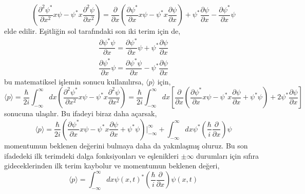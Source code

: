 \documentclass[a4paper,12pt, twoside]{article}
\begin{document}
\begin{equation*}
\left( \dfrac {\partial ^{2}\psi ^{\ast }}{\partial x^{2}}x\psi -\psi ^{\ast }x\dfrac {\partial ^{2}\psi }{\partial x^{2}}\right) = \dfrac {\partial }{\partial x}\left( \dfrac {\partial \psi ^{\ast }}{\partial x}x\psi -\psi ^{\ast }x\dfrac {\partial \psi }{\partial x}\right) +\psi ^{\ast }\dfrac {\partial \psi }{\partial x}-\dfrac {\partial \psi ^{\ast }}{\partial x}\psi 
\end{equation*}
elde edilir. Eşitliğin sol tarafındaki son iki terim için de,
\begin{align*}
\dfrac {\partial \psi ^{\ast }\psi }{\partial x}=\dfrac {\partial \psi ^{\ast }}{\partial x}\psi +\psi ^{\ast }\dfrac {\partial \psi }{\partial x}\\
\dfrac {\partial \psi ^{\ast }}{\partial x}\psi =\dfrac {\partial \psi ^{\ast }\psi }{\partial x}-\psi ^{\ast }\dfrac {\partial \psi }{\partial x}
\end{align*}
bu matematiksel işlemin sonucu kullanılırsa, $\langle p \rangle$ için,
\begin{equation*}
\langle p\rangle =\dfrac {\hbar }{2i}\int ^{\infty }_{-\infty }dx\left( \dfrac {\partial ^{2}\psi ^{\ast }}{\partial x^{2}}x\psi -\psi ^{\ast }x\dfrac {\partial ^{2}\psi }{\partial x^{2}}\right) =  \dfrac {\hbar }{2i}\int ^{\infty }_{-\infty }dx \left[\dfrac {\partial }{\partial x}\left( \dfrac {\partial \psi ^{\ast }}{\partial x}x\psi -\psi ^{\ast }x\dfrac {\partial \psi }{\partial x} + \psi^\ast \psi\right) +2\psi ^{\ast }\dfrac {\partial \psi }{\partial x}\right]
\end{equation*}
sonucuna ulaşılır. Bu ifadeyi biraz daha açarsak,
\begin{equation*}
\langle p\rangle = \dfrac {\hbar }{2i}\left( \dfrac {\partial \psi ^{\ast }}{\partial x}x\psi -\psi ^{\ast }x\dfrac {\partial \psi }{\partial x} + \psi^\ast \psi \right){\bigg |}_{-\infty}^{\infty} + \int ^{\infty }_{-\infty }dx \psi ^{\ast }\left(\dfrac {\hbar }{i}\dfrac {\partial}{\partial x}\right) \psi
\end{equation*}
momentumun beklenen değerini bulmaya daha da yakınlaşmış oluruz. Bu son ifadedeki ilk terimdeki dalga fonksiyonları ve eşlenikleri $\pm\infty$ durumları için sıfıra gideceklerinden ilk terim kaybolur ve momentumun beklenen değeri,
\begin{equation}
\langle p\rangle =  \int ^{\infty }_{-\infty }dx \psi(x,t) ^{\ast }\left(\dfrac {\hbar }{i}\dfrac {\partial}{\partial x}\right) \psi(x,t)
\label{eq:expactation_value_and_op_momentum}
\end{equation}
\end{document}
